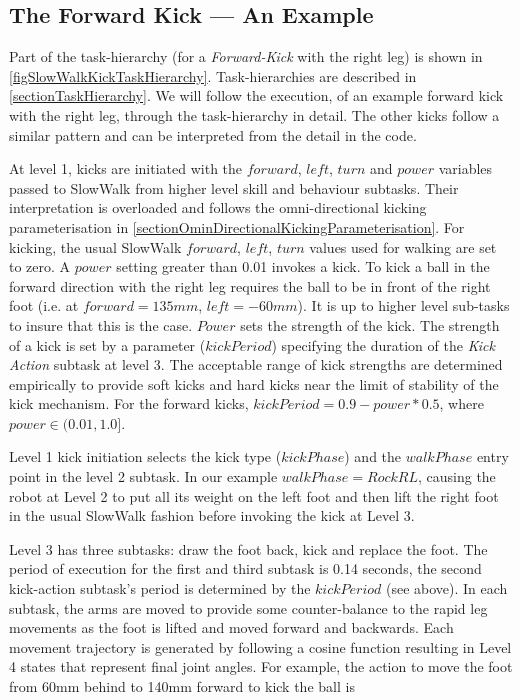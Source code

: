 \documentclass[pdftex,11pt,a4paper]{report}
\begin{document}
\subsection{The Forward Kick --- An Example}
Part of the task-hierarchy (for a \emph{Forward-Kick} with the right leg) is shown in \autoref{figSlowWalkKickTaskHierarchy}. Task-hierarchies are described in \autoref{sectionTaskHierarchy}. We will follow the execution, of an example forward kick with the right leg, through the task-hierarchy in detail. The other kicks follow a similar pattern and can be interpreted from the detail in the code. 

At level 1, kicks are initiated with the $forward$, $left$, $turn$ and
$power$ variables passed to SlowWalk from higher level skill and behaviour
subtasks. Their interpretation is overloaded and follows the
omni-directional kicking parameterisation in \autoref{sectionOminDirectionalKickingParameterisation}. For kicking, the usual
SlowWalk $forward$, $left$, $turn$ values used for walking are set to zero.
A $power$ setting greater than 0.01 invokes a kick. To kick a ball in the
forward direction with the right leg requires the ball to be in front of
the right foot (i.e. at $forward=135mm$, $left=-60mm$). It is up to higher level sub-tasks to insure that this is the case. $Power$ sets the strength of the kick. The strength of a kick is set by a parameter ($kickPeriod$) specifying the duration of the \emph{Kick Action} subtask at level 3. The acceptable range of kick strengths are determined empirically to provide soft kicks and hard kicks near the limit of stability of the kick mechanism. For the forward kicks, $kickPeriod = 0.9 - power * 0.5$, where $power \in (0.01,1.0]$.

Level 1 kick initiation selects the kick type ($kickPhase$) and the $walkPhase$ entry point in the level 2 subtask. In our example $walkPhase = RockRL$, causing the robot at Level 2 to put all its weight on the left foot and then lift the right foot in the usual SlowWalk fashion before invoking the kick at Level 3.

Level 3 has three subtasks: draw the foot back, kick and replace the foot. The period of execution for the first and third subtask is 0.14 seconds, the second kick-action subtask's period is determined by the $kickPeriod$ (see above).
In each subtask, the arms are moved to provide some counter-balance to the rapid leg movements as the foot is lifted and moved forward and backwards. Each movement trajectory is generated by following a cosine function resulting in Level 4 states that represent final joint angles. For example, the action to move the foot from 60mm behind to 140mm forward to kick the ball is 
\end{document}
